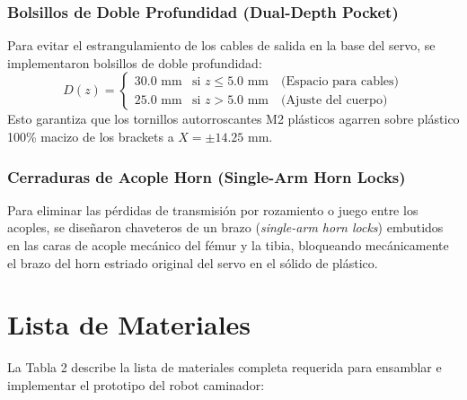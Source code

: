 \documentclass[12pt]{article}
\begin{document}
\subsubsection{Bolsillos de Doble Profundidad (Dual-Depth Pocket)}
Para evitar el estrangulamiento de los cables de salida en la base del servo, se implementaron bolsillos de doble profundidad:
\begin{equation}
    D(z) = 
    \begin{cases} 
      30.0\text{ mm} & \text{si } z \le 5.0\text{ mm} \quad \text{(Espacio para cables)} \\
      25.0\text{ mm} & \text{si } z > 5.0\text{ mm} \quad \text{(Ajuste del cuerpo)}
   \end{cases}
\end{equation}
Esto garantiza que los tornillos autorroscantes M2 plásticos agarren sobre plástico 100\% macizo de los brackets a $X = \pm 14.25\text{ mm}$.

\newpage

\subsubsection{Cerraduras de Acople Horn (Single-Arm Horn Locks)}
Para eliminar las pérdidas de transmisión por rozamiento o juego entre los acoples, se diseñaron chaveteros de un brazo (\textit{single-arm horn locks}) embutidos en las caras de acople mecánico del fémur y la tibia, bloqueando mecánicamente el brazo del horn estriado original del servo en el sólido de plástico.


\section{Lista de Materiales}
La Tabla 2 describe la lista de materiales completa requerida para ensamblar e implementar el prototipo del robot caminador:
\end{document}
